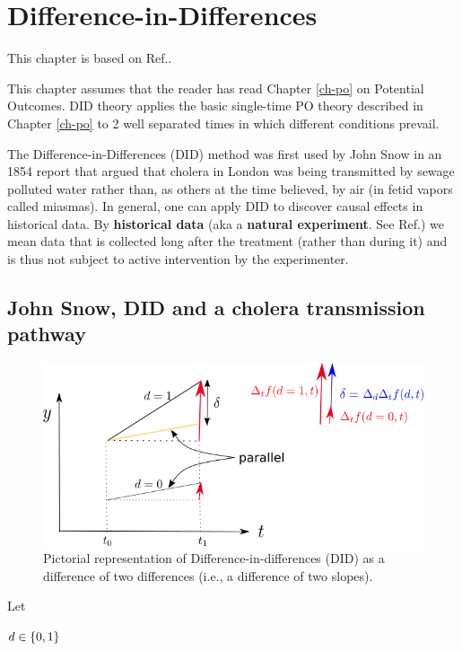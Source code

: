\chapter{Difference-in-Differences}
\label{ch-did}

This chapter is based on
Ref.\cite{book-mixtape}.

This chapter assumes that the
reader has read Chapter \ref{ch-po}
on Potential Outcomes.
DID theory 
applies the basic single-time
PO theory described in Chapter \ref{ch-po}
to 2
well separated times
in which
different conditions prevail.


The Difference-in-Differences (DID)
method was first used by John Snow
in an 1854 report that
argued that 
cholera in London
was being transmitted 
by sewage polluted water
rather than, as others
at the time believed, by air (in fetid vapors
called miasmas).
In general, one can
apply DID to discover 
causal effects in historical data.
By {\bf historical data} (aka a {\bf natural
experiment}. See Ref.\cite{wiki-nat-exp})
we mean data that is collected long
after the treatment (rather than during it)
 and is thus
not  subject to 
active intervention
by the experimenter. 



\section{John Snow, DID  
and a cholera
transmission pathway}


\begin{figure}[h!]
\centering
\includegraphics[width=5in]
{did/dif-dif.png}
\caption{Pictorial representation of
 Difference-in-differences (DID) as a difference
of two differences (i.e., 
a difference of two slopes).} 
\label{fig-dif-dif}
\end{figure}

Let

$d\in \{0,1\}$

